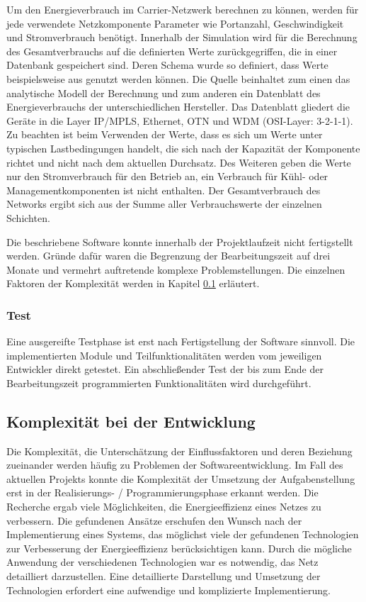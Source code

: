 Um den Energieverbrauch im Carrier-Netzwerk berechnen zu können, werden für jede verwendete Netzkomponente Parameter wie Portanzahl, Geschwindigkeit und Stromverbrauch benötigt. Innerhalb der Simulation wird für die Berechnung des Gesamtverbrauchs auf die definierten Werte zurückgegriffen, die in einer Datenbank gespeichert sind. Deren Schema wurde so definiert, dass Werte beispielsweise aus \cite{vanhedde} genutzt werden können. Die Quelle beinhaltet zum einen das analytische Modell der Berechnung und zum anderen ein Datenblatt \cite{vanhsheet} des Energieverbrauchs der unterschiedlichen Hersteller. Das Datenblatt gliedert die Geräte in die Layer IP/MPLS, Ethernet, OTN und WDM (OSI-Layer: 3-2-1-1). Zu beachten ist beim Verwenden der Werte, dass es sich um Werte unter typischen Lastbedingungen handelt, die sich nach der Kapazität der Komponente richtet und nicht nach dem aktuellen Durchsatz. Des Weiteren geben die Werte nur den Stromverbrauch für den Betrieb an, ein Verbrauch für Kühl- oder Managementkomponenten ist nicht enthalten.
Der Gesamtverbrauch des Networks ergibt sich aus der Summe aller Verbrauchswerte der einzelnen Schichten.

Die beschriebene Software konnte innerhalb der Projektlaufzeit nicht fertigstellt werden. Gründe dafür waren die Begrenzung der Bearbeitungszeit auf drei Monate und vermehrt auftretende komplexe Problemstellungen. Die einzelnen Faktoren der Komplexität werden in Kapitel \ref{subsec:VorgKomplx} erläutert.

\subsubsection{Test}
Eine ausgereifte Testphase ist erst nach Fertigstellung der Software sinnvoll. Die implementierten Module und Teilfunktionalitäten werden vom jeweiligen Entwickler direkt getestet. Ein abschließender Test der bis zum Ende der Bearbeitungszeit programmierten Funktionalitäten wird durchgeführt.


\subsection{Komplexität bei der Entwicklung} \label{subsec:VorgKomplx}
Die Komplexität, die Unterschätzung der Einflussfaktoren und deren Beziehung zueinander werden häufig zu Problemen der Softwareentwicklung. Im Fall des aktuellen Projekts konnte die Komplexität der Umsetzung der Aufgabenstellung erst in der Realisierungs- / Programmierungsphase erkannt werden. Die Recherche ergab viele Möglichkeiten, die Energieeffizienz eines Netzes zu verbessern. Die gefundenen Ansätze erschufen den Wunsch nach der Implementierung eines Systems, das möglichst viele der gefundenen Technologien zur Verbesserung der Energieeffizienz berücksichtigen kann. Durch die mögliche Anwendung der verschiedenen Technologien war es notwendig, das Netz detailliert darzustellen. Eine detaillierte Darstellung und Umsetzung der Technologien erfordert eine aufwendige und komplizierte Implementierung. 


